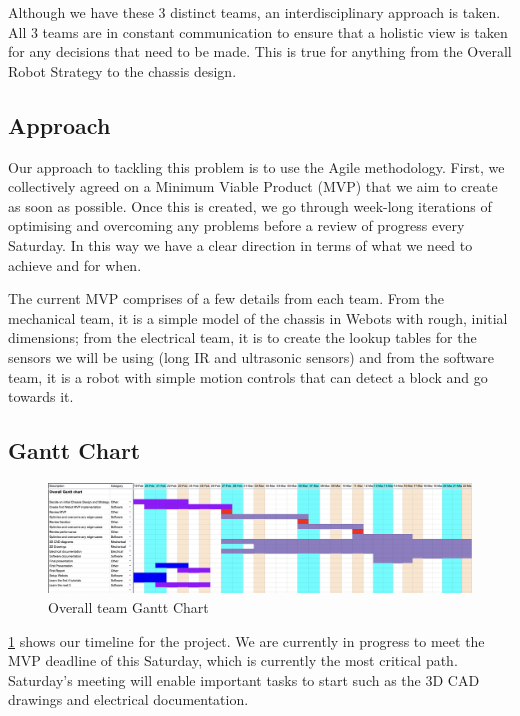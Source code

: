 Although we have these 3 distinct teams, an interdisciplinary approach is taken. All 3 teams are in constant communication to ensure that a holistic view is taken for any decisions that need to be made. This is true for anything from the Overall Robot Strategy to the chassis design.

\subsection{Approach}

Our approach to tackling this problem is to use the Agile methodology. First, we collectively agreed on a Minimum Viable Product (MVP) that we aim to create as soon as possible. Once this is created, we go through week-long iterations of optimising and overcoming any problems before a review of progress every Saturday. In this way we have a clear direction in terms of what we need to achieve and for when.

The current MVP comprises of a few details from each team. From the mechanical team, it is a simple model of the chassis in Webots with rough, initial dimensions; from the electrical team, it is to create the lookup tables for the sensors we will be using (long IR and ultrasonic sensors) and from the software team, it is a robot with simple motion controls that can detect a block and go towards it.

\subsection{Gantt Chart}

\begin{figure}[H]
    \centering
    \includegraphics[width=\textwidth]{GanttChart}
    \caption{Overall team Gantt Chart}
    \label{fig:gantt_chart}
\end{figure}


\cref{fig:gantt_chart} shows our timeline for the project. We are currently in progress to meet the MVP deadline of this Saturday, which is currently the most critical path. Saturday's meeting will enable important tasks to start such as the 3D CAD drawings and electrical documentation.


